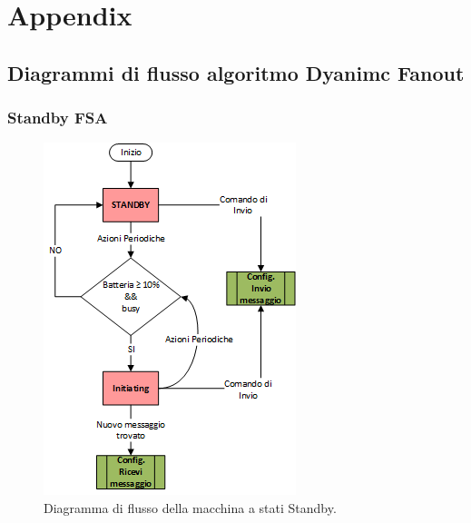 \chapter{Appendix}
\label{apx:diagrammi_fsa}
\section{Diagrammi di flusso algoritmo Dyanimc Fanout}
\subsection{Standby FSA}
\label{apx:stb_fsa}
\begin{figure}[h]
	\centering
	\includegraphics[]{Images/diagrammi_fsa/Standby_fsa}
	\caption[Standby fsa]{Diagramma di flusso della macchina a stati Standby.}
	\label{fig:Standby_fsa}
\end{figure}
\newpage

